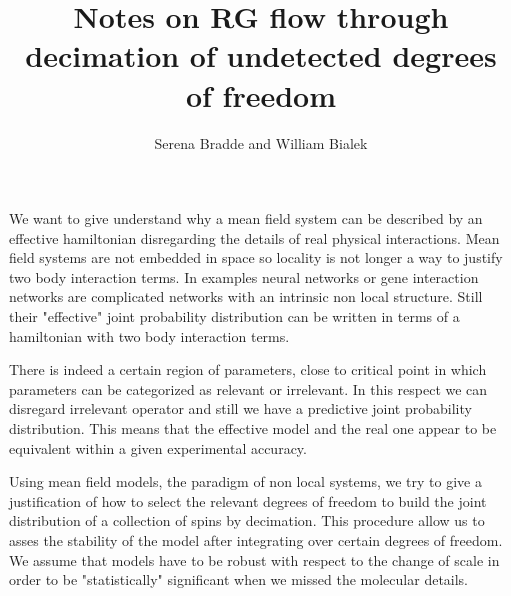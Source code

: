 \documentclass[aps,pre,noshowpacs]{revtex4}
\begin{document}
\title{Notes on RG flow through decimation of undetected degrees of freedom}

\author{Serena Bradde and William Bialek}
\maketitle
We want to give understand why a mean field system can be described by an effective hamiltonian
disregarding the details of real physical interactions. Mean field systems are not embedded in space so locality
is not longer a way to justify two body interaction terms. In examples
neural networks or gene interaction networks are complicated networks
with an intrinsic non local structure. Still their "effective" joint probability distribution
can be written in terms of a hamiltonian with two body interaction terms.

There is indeed a certain region of parameters, close to critical point in which parameters
can be categorized as relevant or irrelevant. In this respect we can disregard irrelevant operator and still
we have a predictive joint probability distribution. This means that 
the effective model and the real one appear to be equivalent within a given experimental accuracy.

Using mean field models, the paradigm of non local systems, we try to give a justification of 
how to select the relevant degrees of freedom to build the joint distribution of a collection of spins
by decimation. This procedure allow us to asses the stability of the model after integrating over
certain degrees of freedom. We assume that models have to be robust with respect to the change of scale
in order to be "statistically" significant when we missed the molecular details.
\end{document}
